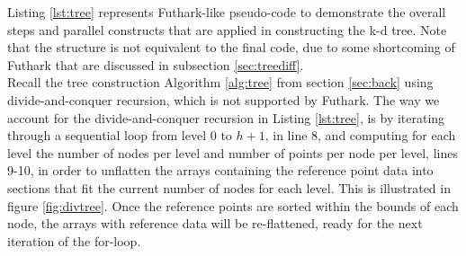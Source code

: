 		



Listing \ref{lst:tree} represents Futhark-like pseudo-code to demonstrate the overall steps and parallel constructs that are applied in constructing the k-d tree. Note that the structure is not equivalent to the final code, due to some shortcoming of Futhark that are discussed in subsection \ref{sec:treediff}. 
\\[2mm]
Recall the tree construction Algorithm \ref{alg:tree} from section \ref{sec:back} using divide-and-conquer recursion, which is not supported by Futhark. The way we account for the divide-and-conquer recursion in Listing \ref{lst:tree}, is by iterating through a sequential loop from level 0 to $h+1$, in line 8, and computing for each level the number of nodes per level and number of points per node per level, lines 9-10, in order to unflatten the arrays containing the reference point data into sections that fit the current number of nodes for each level. This is illustrated in figure \ref{fig:divtree}. Once the reference points are sorted within the bounds of each node, the arrays with reference data will be re-flattened, ready for the next iteration of the for-loop. 

